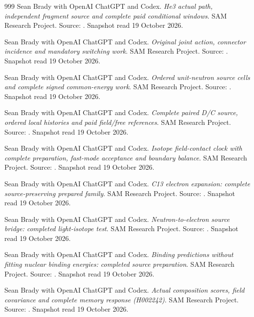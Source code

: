 \begin{thebibliography}{999}
 Sean Brady with OpenAI ChatGPT and Codex. \emph{He3 actual path, independent fragment source and complete paid conditional windows}. SAM Research Project. Source: . Snapshot read 19 October 2026.

 Sean Brady with OpenAI ChatGPT and Codex. \emph{Original joint action, connector incidence and mandatory switching work}. SAM Research Project. Source: . Snapshot read 19 October 2026.

 Sean Brady with OpenAI ChatGPT and Codex. \emph{Ordered unit-neutron source cells and complete signed common-energy work}. SAM Research Project. Source: . Snapshot read 19 October 2026.

 Sean Brady with OpenAI ChatGPT and Codex. \emph{Complete paired D/C source, ordered local histories and paid field/free references}. SAM Research Project. Source: . Snapshot read 19 October 2026.

 Sean Brady with OpenAI ChatGPT and Codex. \emph{Isotope field-contact clock with complete preparation, fast-mode acceptance and boundary balance}. SAM Research Project. Source: . Snapshot read 19 October 2026.

 Sean Brady with OpenAI ChatGPT and Codex. \emph{C13 electron expansion: complete source-preserving prepared family}. SAM Research Project. Source: . Snapshot read 19 October 2026.

 Sean Brady with OpenAI ChatGPT and Codex. \emph{Neutron-to-electron source bridge: completed light-isotope test}. SAM Research Project. Source: . Snapshot read 19 October 2026.

 Sean Brady with OpenAI ChatGPT and Codex. \emph{Binding predictions without fitting nuclear binding energies: completed source preparation}. SAM Research Project. Source: . Snapshot read 19 October 2026.

 Sean Brady with OpenAI ChatGPT and Codex. \emph{Actual composition scores, field covariance and complete memory response (H002242)}. SAM Research Project. Source: . Snapshot read 19 October 2026.


\end{thebibliography}
